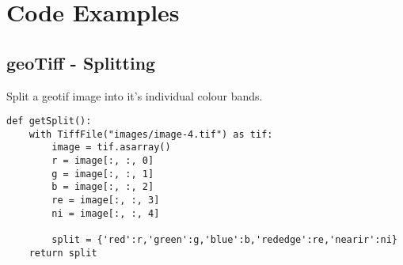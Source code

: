 \chapter{Code Examples}
\begin{comment}
For some projects, it might be relevant to include some code extracts in an appendix. You are not expected to put all of your code here - the correct place for all of your code is in the technical submission that is made in addition to the Project Report. However, if there are some notable aspects of the code that you discuss, including that in an appendix might be useful to make it easier for your readers to access. 

As a general guide, if you are discussing short extracts of code then you are advised to include such code in the body of the report. If there is a longer extract that is relevant, then you might include it as shown in the following section. 

Only include code in the appendix if that code is discussed and referred to in the body of the report. 

\section{Random Number Generator}

The Bayes Durham Shuffle ensures that the psuedo random numbers used in the simulation are further shuffled, ensuring minimal correlation between subsequent random outputs \cite{NumericalRecipes}.

\begin{verbatim}
 code example
\end{verbatim}
\end{comment}

\section{geoTiff - Splitting}
\label{Appendix:code:Splitting}
Split a geotif image into it's individual colour bands.
\begin{verbatim}
def getSplit():
    with TiffFile("images/image-4.tif") as tif:
        image = tif.asarray()
        r = image[:, :, 0]
        g = image[:, :, 1]
        b = image[:, :, 2]
        re = image[:, :, 3]
        ni = image[:, :, 4]

        split = {'red':r,'green':g,'blue':b,'rededge':re,'nearir':ni}
    return split
\end{verbatim}

